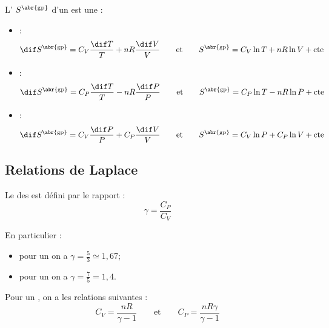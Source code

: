 \begin{propriete}
L' $S^{\text{\abr{gp}}}$ d'un  est une :

\begin{itemize}
\item {} :
\[\dif S^{\text{\abr{gp}}} = C_V \frac{\dif T}{T} + nR \frac{\dif V}{V} \qquad \text{et} \qquad S^{\text{\abr{gp}}} = C_V \ln T + nR \ln V + \text{cte}\]

\item {} :
\[\dif S^{\text{\abr{gp}}} = C_P \frac{\dif T}{T} - nR \frac{\dif P}{P} \qquad \text{et} \qquad S^{\text{\abr{gp}}} = C_P \ln T - nR \ln P + \text{cte}\]

\item {} :
\[\dif S^{\text{\abr{gp}}} = C_V \frac{\dif P}{P} + C_P \frac{\dif V}{V} \qquad \text{et} \qquad S^{\text{\abr{gp}}} = C_V \ln P + C_P \ln V + \text{cte}\]
\end{itemize}
\end{propriete}



\subsection{Relations de Laplace}

\begin{definition}
Le  des  est défini par le rapport :
\[\gamma = \frac{C_P}{C_V}\]
\end{definition}

\begin{remarque}
En particulier :
\begin{itemize}
\item pour un  on a $\gamma = \frac{5}{3} \simeq 1,67$;
\item pour un  on a $\gamma = \frac{7}{5} = 1,4$.
\end{itemize}
\end{remarque}

\begin{propriete}
Pour un , on a les relations suivantes :
\[C_V = \frac{nR}{\gamma - 1} \qquad \text{et} \qquad C_P = \frac{nR \gamma}{\gamma - 1}\]
\end{propriete}

